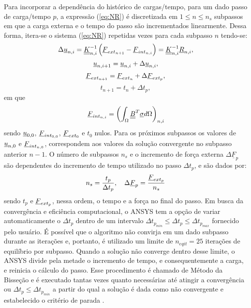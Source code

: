 Para incorporar a dependência do histórico de cargas/tempo, para um dado passo de carga/tempo $p$, a expressão (\ref{eq:NR}) é discretizada em $1 \leq n \leq n_s$ subpassos em que a carga externa e o tempo do passo são incrementados linearmente. Dessa forma, itera-se o sistema (\ref{eq:NR}) repetidas vezes para cada subpasso $n$ tendo-se:
\begin{equation}
	\label{eq:NR1}
	\Delta \underline u_{n,i} = \underline{\underline K}_{n,i}^{-1}\left(\underline{F}_{ext_{n+1}} - \underline{F}_{int_{n,i}} \right) = \underline{\underline K}_{n,i}^{-1}\underline{R}_{n,i},
\end{equation}
\begin{equation}
	\label{eq:NR2}
	\underline u_{n,i+1} = \underline u_{n,i}+\Delta\underline u_{n,i},
\end{equation}
\begin{equation}
	\label{eq:NR3}
	\underline{F}_{ext_{n+1}} = \underline{F}_{ext_n} + \Delta \underline{F}_{{ext}_p},
\end{equation}
\begin{equation}
	\label{eq:NR4}
	t_{n+1} = t_n + \Delta t_p,
\end{equation}
em que
\begin{equation}
	\label{eq:NR5}
	\underline{F}_{int_{n,i}} = \left( \int_{\Omega} \underline{\underline B}^T \underline \sigma d\Omega \right)_{n,i}
\end{equation}
sendo $\underline u_{0,0}$, $\underline{F}_{int_{0,0}}$, $\underline{F}_{ext_0}$   e $t_0$ nulos. Para os próximos subpassos os valores de $\underline u_{n,0}$ e $\underline{F}_{int_{n,0}}$, correspondem aos valores da solução convergente no subpasso anterior $n-1$. O número de subpassos $n_s$ e o incremento de força externa $\Delta \underline{F}_p$ são dependentes do incremento de tempo utilizado no passo $\Delta t_p$, e são dados por:
\begin{equation}
	\label{eq:NR6}
	n_s = \dfrac{t_p}{\Delta t_p},~~~ \Delta \underline{F}_{p} = \dfrac{\underline{F}_{ext_p}}{n_s}
\end{equation}
sendo $t_p$ e $\underline{F}_{ext_p}$, nessa ordem, o tempo e a força no final do passo. Em busca da convergência e eficiência computacional, o ANSYS tem a opção de variar automaticamente o $\Delta t_p$ dentro de um intervalo $\Delta t_{p_{min}} \leq \Delta t_p \leq \Delta t_{p_{max}}$ fornecido pelo usuário. É possível que o algoritmo não convirja em um dado subpasso durante as iterações e, portanto, é utilizado um limite de $n_{eqit} = 25$ iterações de equilíbrio por subpasso. Quando a solução não converge dentro desse limite, o ANSYS divide pela metade o incremento de tempo, e consequentemente a carga, e reinicia o cálculo do passo. Esse procedimento é chamado de Método da Bisseção e é executado tantas vezes quanto necessárias até atingir a convergência ou $\Delta t_p \leq \Delta t_{p_{min}}$ a partir do qual a solução é dada como não convergente e estabelecido o critério de parada \cite[p. 637]{ANSYS2018}.

